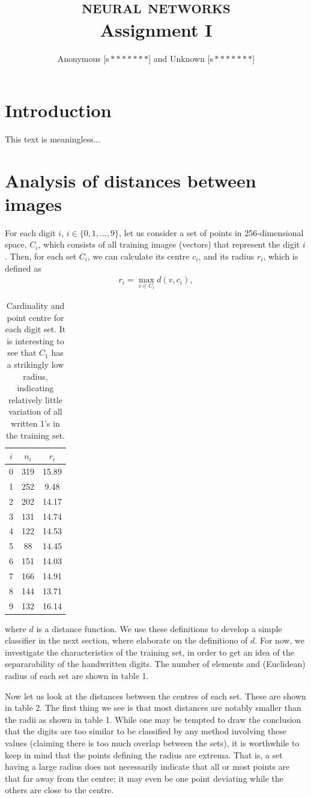 \documentclass[11pt]{article}
\author{Anonymous [s\,$*******$] and Unknown [s\,$*******$]}
\title{\textsc{\Huge neural networks}\\Assignment I}
\begin{document}
\maketitle

\section{Introduction}
This text is meaningless...\cite{asdf}
\section{Analysis of distances between images}
For each digit $i$, $i\in\{0, 1, \ldots, 9\}$, let us consider a set of points in 256-dimensional space, $C_i$, which consists of all training images (vectors) that represent the digit $i$. Then, for each set $C_i$, we can calculate its centre $c_i$, and its radius $r_i$, which is defined as
\begin{align}
r_i=\max_{v\in C_i}d(v, c_i),
\end{align}
\begin{table}
\centering
\begin{tabular}{c|cc}
$i$&$n_i$&$r_i$\\\hline
0&319&15.89\\
1&252&9.48\\
2&202&14.17\\
3&131&14.74\\
4&122&14.53\\
5&88&14.45\\
6&151&14.03\\
7&166&14.91\\
8&144&13.71\\
9&132&16.14
\end{tabular}
\caption{Cardinality and point centre for each digit set. It is interesting to see that $C_1$ has a strikingly low radius, indicating relatively little variation of all written 1's in the training set.}
\end{table}
where $d$ is a distance function. We use these definitions to develop a simple classifier in the next section, where elaborate on the definitiono of $d$. For now, we investigate the characteristics of the training set, in order to get an idea of the separarability of the handwritten digits. The number of elements and (Euclidean) radius of each set are shown in table 1.\par
Now let us look at the distances between the centres of each set. These are shown in table 2. The first thing we see is that most distances are notably smaller than the radii as shown in table 1. While one may be tempted to draw the conclusion that the digits are too similar to be classified by any method involving these values (claiming there is too much overlap between the sets), it is worthwhile to keep in mind that the points defining the radius are extrema. That is, a set having a large radius does not necessarily indicate that all or most points are that far away from the centre; it may even be one point deviating while the others are close to the centre.
\end{document}
